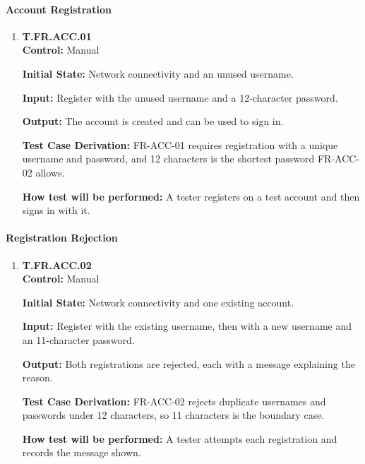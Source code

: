 \documentclass[12pt, titlepage]{article}
\begin{document}
{\sloppy
\paragraph{Account Registration}

\begin{enumerate}

\item{\hypertarget{test-fr-acc-01}{}\textbf{T.FR.ACC.01}\\}
\textbf{Control:} Manual

\textbf{Initial State:} Network connectivity and an unused username.

\textbf{Input:} Register with the unused username and a 12-character password.

\textbf{Output:} The account is created and can be used to sign in.

\textbf{Test Case Derivation:} \mbox{FR-ACC-01} requires registration with a unique
username and password, and 12 characters is the shortest password \mbox{FR-ACC-02}
allows.

\textbf{How test will be performed:} A tester registers on a test account and then signs
in with it.

\end{enumerate}

\paragraph{Registration Rejection}

\begin{enumerate}

\item{\hypertarget{test-fr-acc-02}{}\textbf{T.FR.ACC.02}\\}
\textbf{Control:} Manual

\textbf{Initial State:} Network connectivity and one existing account.

\textbf{Input:} Register with the existing username, then with a new username and an
11-character password.

\textbf{Output:} Both registrations are rejected, each with a message explaining the
reason.

\textbf{Test Case Derivation:} \mbox{FR-ACC-02} rejects duplicate usernames and
passwords under 12 characters, so 11 characters is the boundary case.

\textbf{How test will be performed:} A tester attempts each registration and records the
message shown.


\end{enumerate}}
\end{document}
